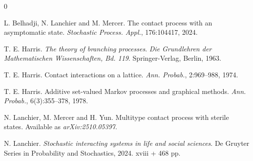 \documentclass[letterpaper,11pt,twoside,keywordsasfootnote,addressatend,noinfoline]{article}
\begin{document}

\begin{thebibliography}{0}

 L. Belhadji, N. Lanchier and M. Mercer. The contact process with an asymptomatic state. \emph{Stochastic Process. Appl.}, 176:104417, 2024.

 T. E. Harris. \emph{The theory of branching processes}. \emph{Die Grundlehren der Mathematischen Wissenschaften, Bd. 119}. Springer-Verlag, Berlin, 1963.

 T. E. Harris. Contact interactions on a lattice. \emph{Ann. Probab.}, 2:969--988, 1974.

 T. E. Harris. Additive set-valued {M}arkov processes and graphical methods. \emph{Ann. Probab.}, 6(3):355--378, 1978.

 N. Lanchier, M. Mercer and H. Yun. Multitype contact process with sterile states. Available as \emph{arXiv:2510.05397}.

 N. Lanchier. \emph{Stochastic interacting systems in life and social sciences}. De Gruyter Series in Probability and Stochastics, 2024. xviii + 468 pp.

\end{thebibliography}
\end{document}
